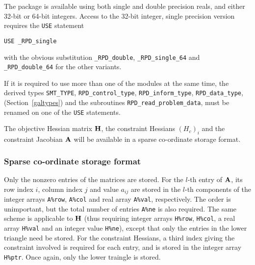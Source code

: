 \documentclass{galahad}
\newcommand{\packagename}{RPD}
\newcommand{\fullpackagename}{\libraryname\_\packagename}
\begin{document}
The package is available using both single and double precision reals, 
and either 32-bit or 64-bit integers. Access to the 32-bit integer,
single precision version requires the {\tt USE} statement
\medskip

\hspace{8mm} {\tt USE \fullpackagename\_single}

\medskip
\noindent
with the obvious substitution {\tt \fullpackagename\_double},
{\tt \fullpackagename\_single\_64} and 
{\tt \fullpackagename\_double\_64} for the other variants.

\noindent
If it is required to use more than one of the modules at the same time, 
the derived types
{\tt SMT\_TYPE},
{\tt \packagename\_control\_type},
{\tt \packagename\_inform\_type},
{\tt \packagename\_data\_type},
(Section~\ref{galtypes})
and the subroutines
{\tt \packagename\_read\_problem\_data},
must be renamed on one of the {\tt USE} statements.


\galmatrix
The objective Hessian matrix ${\mathbf{H}}$, the constraint Hessians $(H_c)_i$ and
the constraint Jacobian ${\mathbf{A}}$ will be available in a sparse co-ordinate
storage format.

\subsubsection{Sparse co-ordinate storage format}\label{coordinate}
Only the nonzero entries of the matrices are stored. For the
$l$-th entry of ${\mathbf{A}}$, its row index $i$, column index $j$
and value $a_{ij}$
are stored in the $l$-th components of the integer arrays {\tt A\%row},
{\tt A\%col} and real array {\tt A\%val}, respectively.
The order is unimportant, but the total
number of entries {\tt A\%ne} is also required.
The same scheme is applicable to
${\mathbf{H}}$ (thus requiring integer arrays {\tt H\%row}, {\tt H\%col}, a real array
{\tt H\%val} and an integer value {\tt H\%ne}),
except that only the entries in the lower triangle need be stored.
For the constraint Hessians, a third index giving the constraint involved
is required for each entry, and is stored in the integer array
{\tt H\%ptr}. Once again, only the lower traingle is stored.




\end{document}
